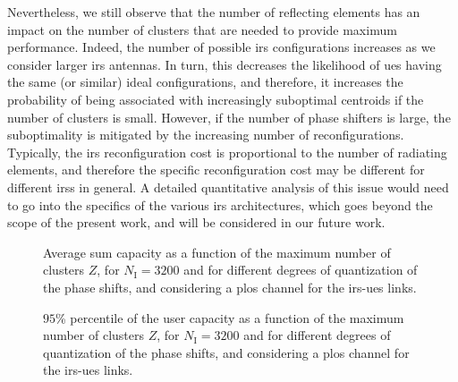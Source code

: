 Nevertheless, we still observe that the number of reflecting elements has an impact on the number of clusters that are needed to provide maximum performance.
Indeed, the number of possible \gls{irs} configurations increases as we consider larger \gls{irs} antennas. In turn, this decreases the likelihood of \glspl{ue} having the same (or similar) ideal configurations, and therefore, it increases the probability of being associated with increasingly suboptimal centroids if the number of clusters is small. However, if the number of phase shifters is large, the suboptimality is mitigated by the increasing number of reconfigurations. Typically, the \gls{irs} reconfiguration cost is proportional to the number of
radiating elements, and therefore the specific reconfiguration cost may be different for different \glspl{irs} in general. A detailed quantitative analysis of this issue would need to go into the specifics of the various \gls{irs} architectures, which goes beyond the scope of the present work, and will be considered in our future work.

\begin{figure}[t]
    \centering
    \setlength{}
    \setlength{}
    
    \caption{Average sum capacity as a function of the maximum number of clusters $Z$, for $N_{\mathrm I}=3200$ and for different degrees of quantization of the phase shifts, and considering a \gls{plos} channel for the \gls{irs}-\glspl{ue} links.}
    \label{fig:cap_vs_bits}
\end{figure}
\begin{figure}[t]
    \centering
    \setlength{}
    \setlength{}
    
    \caption{$95$\% percentile of the user capacity as a function of the maximum number of clusters $Z$, for $N_{\mathrm I}=3200$ and for different degrees of quantization of the phase shifts, and considering a \gls{plos} channel for the \gls{irs}-\glspl{ue} links.}
    \label{fig:quantile_vs_bits}
\end{figure}

